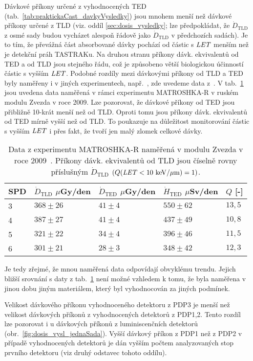 Dávkové příkony určené z vyhodnocených TED (tab.~\ref{tab:praktickaCast_davkyVysledky}) jsou mnohem menší než dávkové příkony určené z TLD (viz. oddíl \ref{sec:dosis_vysledky}; lze předpokládat, že $\dot{D}_{\text{TLD}}$ z osmé sady budou vycházet alespoň řádově jako $\dot{D}_{\text{TLD}}$ v předchozích sadách). Je to tím, že převážná část absorbované dávky pochází od částic s $\mathit{LET}$ menším než je detekční práh TASTRAKu. Na druhou stranu příkony dávk. ekvivalentů od TED a od TLD jsou stejného řádu, což je způsobeno větší biologickou účinností částic s vyšším $\mathit{LET}$. Podobné rozdíly mezi dávkovými příkony od TLD a TED byly naměřeny i v jiných experimentech, např.~\cite{japonsky,passDetectors,ambrozova_dvaExperimenty}, zde uvedeme data z~\cite{passDetectors}. V tab.~\ref{tab:praktickaCast_rozdilyJinyExp} jsou uvedena data naměřená v rámci experimentu MATROSHKA-R v
ruském modulu Zvezda v roce 2009. Lze pozorovat, že dávkové příkony od TED jsou přibližně 10-krát menší než od TLD. Oproti tomu jsou příkony dávk. ekvivalentů od TED mírně vyšší než od TLD. To poukazuje na důležitost monitorování částic s vyšším $\mathit{LET}$ i přes fakt, že tvoří jen malý zlomek celkové dávky.
\begin{table}[h]
  \centering
  \begin{tabular}{lllll}
	\toprule
	SPD&$\dot{D}_{\text{TLD}}$ $\mu$Gy/den&$\dot{D}_{\text{TED}}$ $\mu$Gy/den&$\dot{H}_{\text{TED}}$ $\mu$Sv/den&$Q$ [-]\\
	\midrule
	3&$368\pm26$&$41\pm4$&$550\pm62$&$13,5$\\
	4&$387\pm27$&$41\pm4$&$437\pm49$&$10,8$\\
	5&$321\pm22$&$34\pm4$&$396\pm46$&$11,5$\\
	6&$301\pm21$&$28\pm3$&$348\pm42$&$12,3$\\
	\bottomrule
  \end{tabular}
  \caption{Data z experimentu MATROSHKA-R naměřená v modulu Zvezda v roce 2009~\cite{passDetectors}. Příkony dávk. ekvivalentů od TLD jsou číselně rovny příslušným $\dot{D}_{\text{TLD}}$ $(Q(\mathit{LET}<\nobreak10\ \mathrm{keV/\mu m})=1)$.}
  \label{tab:praktickaCast_rozdilyJinyExp}
\end{table}
Je tedy zřejmé, že mnou naměřená data odpovídají obvyklému trendu. Jejich bližší srovnání s daty z tab.~\ref{tab:praktickaCast_rozdilyJinyExp} není možné vzhledem k tomu, že byla naměřena v jinou dobu jiným materiálem, který byl vyhodnocován za jiných podmínek. 

Velikost dávkového příkonu vyhodnoceného detektoru z PDP3 je menší než velikost dávkových příkonů z vyhodnocených detektorů z PDP1,2. Tento rozdíl lze pozorovat i u dávkových příkonů z luminiscenčních detektorů (obr.~\ref{fig:dosis_vysl_jednaSada}). Vyšší dávkový příkon z PDP1 než z PDP2 v případě vyhodnocených detektorů je dán vyšším počtem analyzovaných stop prvního detektoru (viz druhý odstavec tohoto oddílu).

